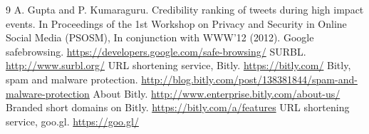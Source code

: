 \documentclass[conference]{IEEEtran}
\begin{document}
\begin{thebibliography} {9}
 A. Gupta and P. Kumaraguru. Credibility ranking of tweets during high impact events. In Proceedings of the 1st Workshop on Privacy and Security in Online Social Media (PSOSM), In conjunction with WWW'12 (2012). 
 Google safebrowsing. \url{https://developers.google.com/safe-browsing/}
 SURBL. \url{http://www.surbl.org/}
 URL shortening service, Bitly. \url{https://bitly.com/}
 Bitly, spam and malware protection. \url{http://blog.bitly.com/post/138381844/spam-and-malware-protection}
 About Bitly. \url{http://www.enterprise.bitly.com/about-us/}
 Branded short domains on Bitly. \url{https://bitly.com/a/features}
 URL shortening service, goo.gl. \url{https://goo.gl/}
\end{thebibliography}
\end{document}
